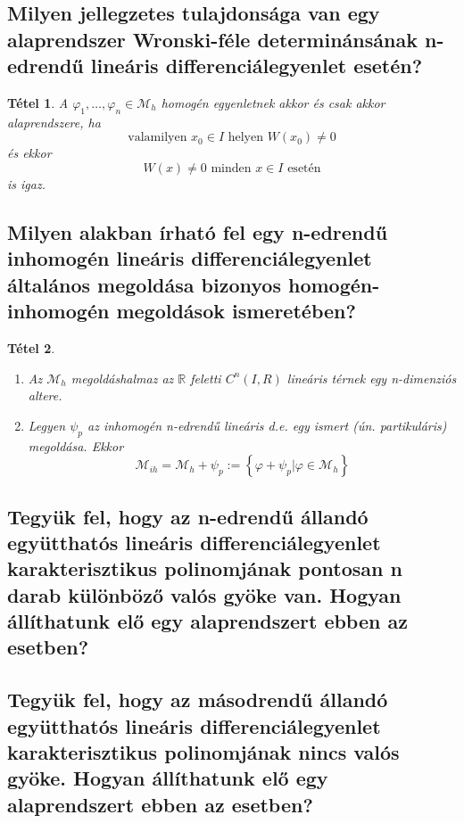 \documentclass[12pt,a4paper]{article}
\newcommand{\R}{\mathbb{R}}
\newcommand{\CM}{\mathcal{M}}
\newcommand{\f}{\varphi}
\newcommand{\braces}[1]{\left\lbrace #1 \right\rbrace}
\newtheorem{tet}{Tétel}[section]
\begin{document}
\subsection{Milyen jellegzetes tulajdonsága van egy alaprendszer Wronski-féle determinánsának n-edrendű lineáris differenciálegyenlet esetén?}
\begin{tet}
A $\f_1, \ldots , \f_n \in \CM_h$ homogén egyenletnek akkor és csak akkor alaprendszere, ha 
\[
\text{valamilyen } x_0 \in I \text{ helyen } W(x_0) \neq 0
\]
és ekkor 
\[
W(x) \neq 0 \text{ minden } x \in I \text{ esetén}
\]
is igaz.
\end{tet}

\subsection{Milyen alakban írható fel egy n-edrendű inhomogén lineáris differenciálegyenlet általános megoldása bizonyos homogén-inhomogén megoldások ismeretében?}
\begin{tet}
\begin{enumerate}
\item Az $\CM_h$ megoldáshalmaz az $\R$ feletti $C^n(I,R)$ lineáris térnek egy n-dimenziós altere.
\item Legyen $\psi_p$ az inhomogén n-edrendű lineáris d.e. egy ismert (ún. partikuláris) megoldása. Ekkor
\[
\CM_{ih} = \CM_h + \psi_p := \braces{\f+ \psi_p \vert \f \in \CM_h}
\]
\end{enumerate}
\end{tet}

\subsection{Tegyük fel, hogy az n-edrendű állandó együtthatós lineáris differenciálegyenlet karakterisztikus polinomjának pontosan n darab különböző valós gyöke van. Hogyan állíthatunk elő egy alaprendszert ebben az esetben?}

\subsection{Tegyük fel, hogy az másodrendű állandó együtthatós lineáris differenciálegyenlet karakterisztikus polinomjának nincs valós gyöke. Hogyan állíthatunk elő egy alaprendszert ebben az esetben?}
\end{document}
